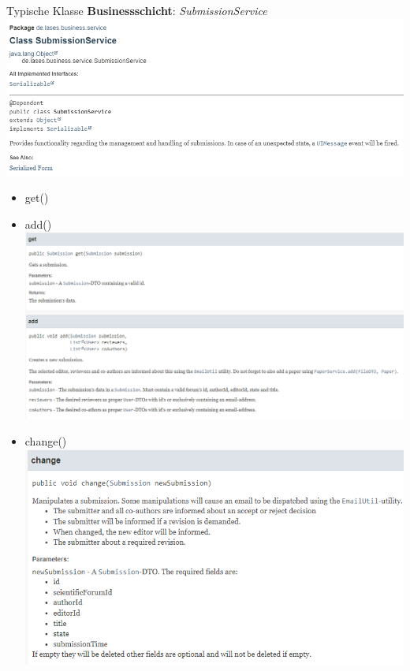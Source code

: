 \documentclass{beamer}
\begin{document}

    \begin{frame}{Typische Klasse \textbf{Businessschicht}:}
        \emph{SubmissionService}
        \centering
        \includegraphics[height=1.1\textheight]{graphics/service/doc_service}
        \pause
        \begin{itemize}
            \item get()
            \item add()
            \centering
            \includegraphics[height=1.1\textheight]{graphics/service/doc_get_add}
            \item change()
            \centering
            \includegraphics[height=1.1\textheight]{graphics/service/doc_change}


\end{itemize}
\end{frame}
\end{document}
